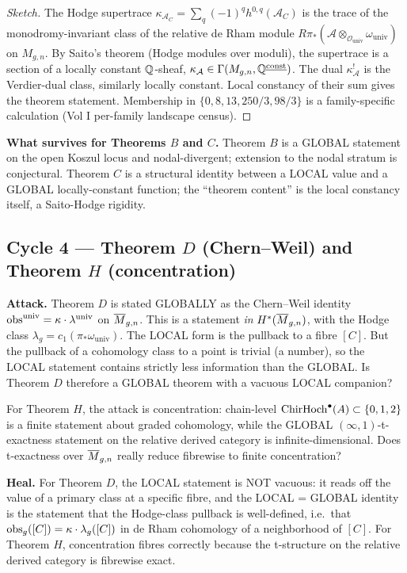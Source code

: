 \begin{proof}[Sketch]
The Hodge supertrace $\kappa_{\mathcal{A}_C} = \sum_q (-1)^q
h^{0,q}(\mathcal{A}_C)$ is the trace of the monodromy-invariant
class of the relative de Rham module $R\pi_* (\mathcal{A}
\otimes_{\mathcal{O}_{\mathrm{univ}}} \omega_{\mathrm{univ}})$ on
$M_{g,n}$. By Saito's theorem (Hodge modules over moduli), the
supertrace is a section of a locally constant $\mathbb{Q}$-sheaf,
$\kappa_{\mathcal{A}} \in \Gamma(M_{g,n}, \mathbb{Q}^{\underline{\mathrm{const}}})$.
The dual $\kappa^!_{\mathcal{A}}$ is the Verdier-dual class, similarly
locally constant. Local constancy of their sum gives the theorem
statement. Membership in $\{0, 8, 13, 250/3, 98/3\}$ is a family-specific
calculation (Vol I per-family landscape census).
\end{proof}

\textbf{What survives for Theorems $B$ and $C$.} Theorem $B$ is a
GLOBAL statement on the open Koszul locus and nodal-divergent; extension
to the nodal stratum is conjectural. Theorem $C$ is a structural
identity between a LOCAL value and a GLOBAL locally-constant function;
the ``theorem content'' is the local constancy itself, a Saito-Hodge
rigidity.

\subsection*{Cycle 4 --- Theorem $D$ (Chern--Weil) and Theorem $H$
(concentration)}

\textbf{Attack.} Theorem $D$ is stated GLOBALLY as the Chern--Weil
identity $\mathrm{obs}^{\mathrm{univ}} = \kappa \cdot \lambda^{\mathrm{univ}}$
on $\overline{M}_{g,n}$. This is a statement \emph{in} $H^*(\overline{M}_{g,n})$,
with the Hodge class $\lambda_g = c_1(\pi_* \omega_{\mathrm{univ}})$.
The LOCAL form is the pullback to a fibre $[C]$. But the pullback of a
cohomology class to a point is trivial (a number), so the LOCAL
statement contains strictly less information than the GLOBAL. Is
Theorem $D$ therefore a GLOBAL theorem with a vacuous LOCAL companion?

For Theorem $H$, the attack is concentration: chain-level
$\mathrm{ChirHoch}^\bullet(A) \subset \{0, 1, 2\}$ is a finite statement about
graded cohomology, while the GLOBAL $(\infty, 1)$-t-exactness statement
on the relative derived category is infinite-dimensional. Does
t-exactness over $\overline{M}_{g,n}$ really reduce fibrewise to finite
concentration?

\textbf{Heal.} For Theorem $D$, the LOCAL statement is NOT vacuous:
it reads off the value of a primary class at a specific fibre, and
the LOCAL = GLOBAL identity is the statement that the Hodge-class
pullback is well-defined, i.e.\ that $\mathrm{obs}_g([C]) = \kappa \cdot
\lambda_g([C])$ in de Rham cohomology of a neighborhood of $[C]$. For
Theorem $H$, concentration fibres correctly because the t-structure on
the relative derived category is fibrewise exact.

